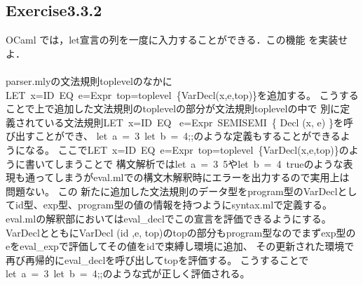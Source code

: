 \documentclass[a4paper,11pt,oneside,openany]{jsarticle}
\begin{document}
\subsection{Exercise3.3.2}
    OCaml では，let宣言の列を一度に入力することができる．この機能 を実装せよ．\\\\
    parser.mlyの文法規則toplevelのなかに LET\ x=ID\ EQ\ e=Expr\ top=toplevel\ \{VarDecl(x,e,top)\}を追加する。
    こうすることで上で追加した文法規則のtoplevelの部分が文法規則toplevelの中で
    別に定義されている文法規則LET\ x=ID\ EQ \ e=Expr\ SEMISEMI\ \{ Decl (x, e) \}を呼び出すことができ、
    let\ a\ =\ 3\ let\ b\ =\ 4;;のような定義もすることができるようになる。
    ここでLET\ x=ID\ EQ\ e=Expr\ top=toplevel\ \{VarDecl(x,e,top)\}のように書いてしまうことで
    構文解析ではlet\ a\ =\ 3\ 5やlet\ b\ =\ 4\ trueのような表現も通ってしまうがeval.mlでの構文木解釈時にエラーを出力するので実用上は問題ない。
    この 新たに追加した文法規則のデータ型をprogram型のVarDeclとしてid型、exp型、program型の値の情報を持つようにsyntax.mlで定義する。
    eval.mlの解釈部においてはeval\_declでこの宣言を評価できるようにする。
    VarDeclとともにVarDecl (id ,e, top)のtopの部分もprogram型なのでまずexp型のeをeval\_expで評価してその値をidで束縛し環境に追加、
    その更新された環境で再び再帰的にeval\_declを呼び出してtopを評価する。
    こうすることでlet\ a\ =\ 3\ let\ b\ =\ 4;;のような式が正しく評価される。
\end{document}
